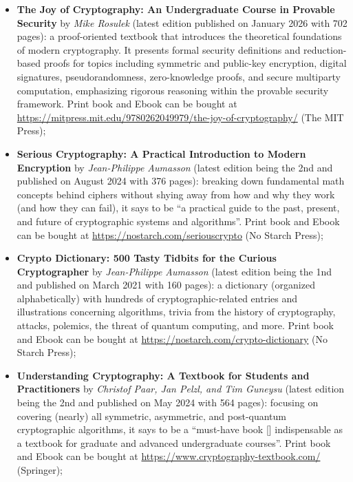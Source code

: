 \begin{itemize}

	\item \textbf{The Joy of Cryptography: An Undergraduate Course in Provable Security} by \textit{Mike Rosulek} (latest edition published on January 2026 with 702 pages): a proof-oriented textbook that introduces the theoretical foundations of modern cryptography. It presents formal security definitions and reduction-based proofs for topics including symmetric and public-key encryption, digital signatures, pseudorandomness, zero-knowledge proofs, and secure multiparty computation, emphasizing rigorous reasoning within the provable security framework. Print book and Ebook can be bought at \url{https://mitpress.mit.edu/9780262049979/the-joy-of-cryptography/} (The MIT Press);
	
	\item \textbf{Serious Cryptography: A Practical Introduction to Modern Encryption} by \textit{Jean-Philippe Aumasson} (latest edition being the 2nd and published on August 2024 with 376 pages): breaking down fundamental math concepts behind ciphers without shying away from how and why they work (and how they can fail), it says to be ``a practical guide to the past, present, and future of cryptographic systems and algorithms''. Print book and Ebook can be bought at \url{https://nostarch.com/seriouscrypto} (No Starch Press);
	
	\item \textbf{Crypto Dictionary: 500 Tasty Tidbits for the Curious Cryptographer} by \textit{Jean-Philippe Aumasson} (latest edition being the 1nd and published on March 2021 with 160 pages): a dictionary (organized alphabetically) with hundreds of cryptographic-related entries and illustrations concerning algorithms, trivia from the history of cryptography, attacks, polemics, the threat of quantum computing, and more. Print book and Ebook can be bought at \url{https://nostarch.com/crypto-dictionary} (No Starch Press);
	
	\item \textbf{Understanding Cryptography: A Textbook for Students and Practitioners} by \textit{Christof Paar, Jan Pelzl, and Tim Guneysu} (latest edition being the 2nd and published on May 2024 with 564 pages): focusing on covering (nearly) all symmetric, asymmetric, and post-quantum cryptographic algorithms, it says to be a ``must-have book [] indispensable as a textbook for graduate and advanced undergraduate courses''. Print book and Ebook can be bought at \url{https://www.cryptography-textbook.com/} (Springer);
	

\end{itemize}
